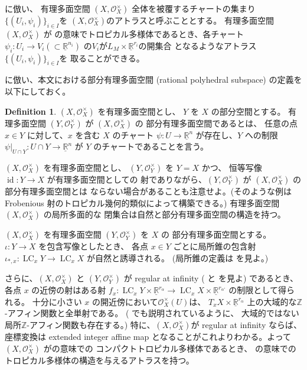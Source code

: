 \documentclass[a4paper,dvipdfmx,reqno,12pt]{amsart}
\theoremstyle{definition}
\newtheorem{definition}[theorem]{Definition}
\newcommand{\opn}[1]{\operatorname{#1}}
\numberwithin{equation}{section}
\begin{document}
\cite{demedrano2023chern}に倣い、
有理多面空間 $(X,\mathcal{O}_X^{\times})$
全体を被覆するチャートの集まり
$\{(U_i,\psi_i)\}_{i\in I}$を
$(X,\mathcal{O}_X^{\times})$のアトラスと呼ぶこととする。
有理多面空間$(X,\mathcal{O}_X^{\times})$ が
\cite[Definition 6.1]{gross2019sheaftheoretic}
の意味でトロピカル多様体であるとき、各チャート
$\psi_i\colon U_i\to V_i(\subset \underline{\mathbb{R}}^{n_i})$
の$V_i$が$L_M\times \underline{\mathbb{R}}^{r_i}$の開集合
となるようなアトラス$\{(U_i,\psi_i)\}_{i\in I}$を
取ることができる。

\cite[Definition 2.14]{demedrano2023chern}
に倣い、本文における部分有理多面空間
(rational polyhedral subspace)
の定義を以下にしておく。


\begin{definition}

$(X,\mathcal{O}_X^{\times})$ を有理多面空間とし、
$Y$ を $X$ の部分空間とする。
有理多面空間 $(Y,\mathcal{O}_Y^{\times})$ が 
$(X,\mathcal{O}_X^{\times})$ の
部分有理多面空間であるとは、
任意の点 $x\in Y$ に対して、$x$ を含む
$X$ のチャート $\psi \colon U\to \underline{\mathbb{R}}^{n}$
が存在し、$Y$ への制限 
$\psi|_{U\cap Y}\colon U\cap Y \to \underline{\mathbb{R}}^{n}$
が $Y$ のチャートであることを言う。
\end{definition}

$(X,\mathcal{O}_X^{\times})$ を有理多面空間とし、
$(Y,\mathcal{O}_Y^{\times})$ を $Y=X$ かつ、
恒等写像 $\opn{id}\colon Y\to X$ が有理多面空間としての
射でありながら、$(Y,\mathcal{O}_Y^{\times})$ が
$(X,\mathcal{O}_X^{\times})$ の部分有理多面空間とは
ならない場合があることも注意せよ。(そのような例は
Frobenious 射のトロピカル幾何的類似によって構築できる。)
有理多面空間 $(X,\mathcal{O}_X^{\times})$ の局所多面的な
閉集合は自然と部分有理多面空間の構造を持つ。

$(X,\mathcal{O}_X^{\times})$ を有理多面空間
$(Y,\mathcal{O}_Y^{\times})$ を $X$ の
部分有理多面空間とする。
$\iota\colon Y \to X$ を包含写像としたとき、
各点 $x\in Y$ ごとに局所錐の包含射
$\iota_{*,x}\colon \opn{LC}_x Y\to \opn{LC}_x X$
が自然と誘導される。
(局所錐の定義は\cite[]{MR4637248}
を見よ。)

さらに、$(X,\mathcal{O}_X^{\times})$ と
$(Y,\mathcal{O}_Y^{\times})$ が
regular at infinity 
(\cite[]{MR4637248} と
\cite[Definition 1.2]{MR3330789} を見よ) 
であるとき、各点 $x$ の近傍の射はある射
$f_{x}\colon \opn{LC}_x Y\times 
\underline{\mathbb{R}}^{r_{\alpha}}
\to \opn{LC}_x X\times \underline{\mathbb{R}}^{r_{\alpha'}}$
の制限として得られる。
十分に小さい $x$
の開近傍において$\mathcal{O}_X^{\times}(U)$は、
$T_x X\times \underline{\mathbb{R}}^{r_{\alpha}}$
上の大域的な$\mathbb{Z}$-アフィン関数と全単射である。
(\cite[Example 2.1]{MR4637248} でも説明されているように、
大域的ではない局所$\mathbb{Z}$-アフィン関数も存在する。)
特に、$(X,\mathcal{O}_X^{\times})$が regular at infinity
ならば、座標変換は
extended integer affine map \cite[Definition 2.2]{demedrano2023chern}
となることがこれよりわかる。よって
$(X,\mathcal{O}_X^{\times})$ 
が\cite[Definition 6.1]{gross2019sheaftheoretic}の意味での
コンパクトトロピカル多様体であるとき、
\cite[Definition 2.3]{demedrano2023chern}
の意味でのトロピカル多様体の構造を与えるアトラスを持つ。
\end{document}
